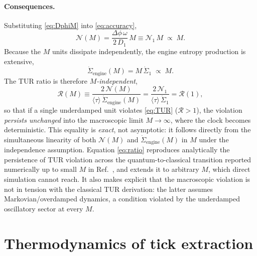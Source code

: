 \documentclass[aps,pre,reprint,amsmath,amssymb,floatfix,nofootinbib]{revtex4-2}
\newcommand{\avg}[1]{\langle #1 \rangle}
\newcommand{\Sdot}{\dot{\Sigma}}
\begin{document}
\paragraph*{Consequences.}
Substituting \eqref{eq:DphiM} into \eqref{eq:accuracy},
\begin{equation}
  \mathcal{N}(M) = \frac{\Delta\phi\,\omega}{2\,D_1}\,M
  \equiv \mathcal{N}_1\,M
  \;\propto\; M .
  \label{eq:NM}
\end{equation}
Because the $M$ units dissipate independently, the engine entropy
production is extensive,
\begin{equation}
  \Sdot_{\mathrm{engine}}(M) = M\,\Sdot_1 \;\propto\; M .
  \label{eq:SM}
\end{equation}
The TUR ratio is therefore \emph{$M$-independent},
\begin{equation}
  \mathcal{R}(M)
  \equiv \frac{2\,\mathcal{N}(M)}{\avg{\tau}\,\Sdot_{\mathrm{engine}}(M)}
  = \frac{2\,\mathcal{N}_1}{\avg{\tau}\,\Sdot_1}
  = \mathcal{R}(1),
  \label{eq:ratio}
\end{equation}
so that if a single underdamped unit violates \eqref{eq:TUR}
($\mathcal{R}>1$), the violation \emph{persists unchanged} into the
macroscopic limit $M\to\infty$, where the clock becomes deterministic.
This equality is \emph{exact}, not asymptotic: it follows directly from
the simultaneous linearity of both $\mathcal{N}(M)$ and
$\Sdot_{\mathrm{engine}}(M)$ in $M$ under the independence assumption.
Equation \eqref{eq:ratio} reproduces analytically the persistence of TUR
violation across the quantum-to-classical transition reported
numerically up to small $M$ in Ref.~\cite{Brunelli2026}, and extends it
to arbitrary $M$, which direct simulation cannot reach. It also makes
explicit that the macroscopic violation is not in tension with the
classical TUR derivation: the latter assumes Markovian/overdamped
dynamics, a condition violated by the underdamped oscillatory sector at
every $M$.

\section{Thermodynamics of tick extraction}
\label{sec:thermo}
\end{document}
